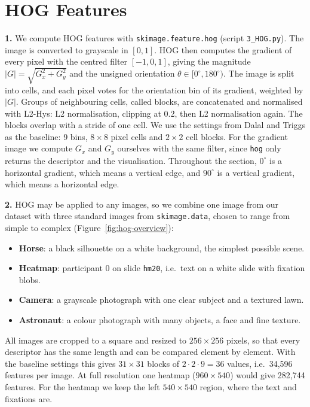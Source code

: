 
\section{HOG Features}

\textbf{1.}
We compute HOG features with \texttt{skimage.feature.hog} (script \texttt{3\_HOG.py}). The image is converted to grayscale in $[0,1]$. HOG then computes the gradient of every pixel with the centred filter $[-1,0,1]$, giving the magnitude $|G|=\sqrt{G_x^2+G_y^2}$ and the unsigned orientation $\theta \in [0^\circ,180^\circ)$. The image is split into cells, and each pixel votes for the orientation bin of its gradient, weighted by $|G|$. Groups of neighbouring cells, called blocks, are concatenated and normalised with L2-Hys: L2 normalisation, clipping at 0.2, then L2 normalisation again. The blocks overlap with a stride of one cell. We use the settings from Dalal and Triggs as the baseline: 9 bins, $8\times8$ pixel cells and $2\times2$ cell blocks. For the gradient image we compute $G_x$ and $G_y$ ourselves with the same filter, since \texttt{hog} only returns the descriptor and the visualisation. Throughout the section, $0^\circ$ is a horizontal gradient, which means a vertical edge, and $90^\circ$ is a vertical gradient, which means a horizontal edge.

\textbf{2.}
HOG may be applied to any images, so we combine one image from our dataset with three standard images from \texttt{skimage.data}, chosen to range from simple to complex (Figure~\ref{fig:hog-overview}):
\begin{itemize}
    \item \textbf{Horse}: a black silhouette on a white background, the simplest possible scene.
    \item \textbf{Heatmap}: participant 0 on slide \texttt{hm20}, i.e.\ text on a white slide with fixation blobs.
    \item \textbf{Camera}: a grayscale photograph with one clear subject and a textured lawn.
    \item \textbf{Astronaut}: a colour photograph with many objects, a face and fine texture.
\end{itemize}
All images are cropped to a square and resized to $256\times256$ pixels, so that every descriptor has the same length and can be compared element by element. With the baseline settings this gives $31\times31$ blocks of $2\cdot2\cdot9=36$ values, i.e.\ 34,596 features per image. At full resolution one heatmap ($960\times540$) would give 282,744 features. For the heatmap we keep the left $540\times540$ region, where the text and fixations are.

